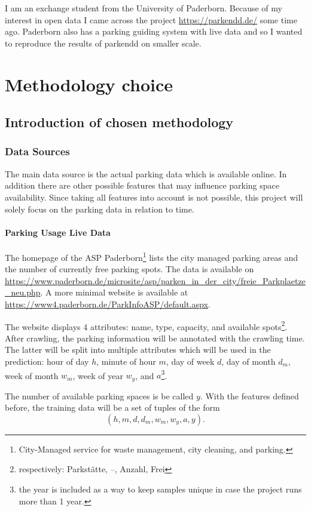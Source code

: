 \documentclass[journal,10pt]{IEEEtran}
\newcommand{\hod}{h}
\newcommand{\moh}{m}
\newcommand{\dow}{d}
\newcommand{\dom}{d_m}
\newcommand{\wom}{w_m}
\newcommand{\woy}{w_y}
\newcommand{\yyy}{a}
\begin{document}
I am an exchange student from the University of Paderborn. Because of my interest in open data I came across the project \url{https://parkendd.de/}\cite{parkendd} some time ago. Paderborn also has a parking guiding system with live data and so I wanted to reproduce the results of parkendd on smaller scale.

\section{Methodology choice}

\subsection{Introduction of chosen methodology}
\subsubsection{Data Sources}\label{data sources}
The main data source is the actual parking data which is available online. In addition there are other possible features that may influence parking space availability. Since taking all features into account is not possible, this project will solely focus on the parking data in relation to time. 

\paragraph{Parking Usage Live Data}
The homepage of the ASP Paderborn\footnote{City-Managed service for waste management, city cleaning, and parking.} lists the city managed parking areas and the number of currently free parking spots. 
The data is available on \url{https://www.paderborn.de/microsite/asp/parken_in_der_city/freie_Parkplaetze_neu.php}. A more minimal website is available at \url{https://www4.paderborn.de/ParkInfoASP/default.aspx}. 

The website displays 4 attributes: name, type, capacity, and available spots\footnote{respectively: Parkstätte, --, Anzahl, Frei}. After crawling, the parking information will be annotated with the crawling time. The latter will be split into multiple attributes which will be used in the prediction: hour of day \(\hod\), minute of hour \(\moh\), day of week \(\dow\), day of month \(\dom\), week of month \(\wom\), week of year \(\woy\), and \(\yyy\)\footnote{the year is included as a way to keep samples unique in case the project runs more than 1 year.}.

The number of available parking spaces is be called \(y\). With the features defined before, the training data will be a set of tuples of the form  
\[
(\hod, \moh, \dow, \dom, \wom, \woy, \yyy, y)\text{.}
\]
\end{document}
